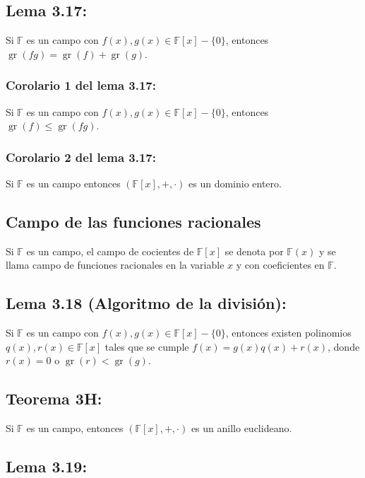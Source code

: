 \documentclass{article}
\DeclareMathOperator{\gr}{gr}
\begin{document}
\subsection*{\color{blue} Lema 3.17:}

Si $\mathbb{F}$ es un campo con $f(x),g(x)\in\mathbb{F}[x]-\{0\}$, entonces $\gr(fg)=\gr(f)+\gr(g)$.

\subsubsection*{\color{blue} Corolario 1 del lema 3.17:}

Si $\mathbb{F}$ es un campo con $f(x),g(x)\in\mathbb{F}[x]-\{0\}$, entonces $\gr(f)\leq\gr(fg)$.

\subsubsection*{\color{blue} Corolario 2 del lema 3.17:}

Si $\mathbb{F}$ es un campo entonces $(\mathbb{F}[x],+,\cdot)$ es un dominio entero.

\subsection*{\color{violet} Campo de las funciones racionales}

Si $\mathbb{F}$ es un campo, el campo de cocientes de $\mathbb{F}[x]$ se denota por $\mathbb{F}(x)$ y se llama campo de funciones racionales en la variable $x$ y con coeficientes en $\mathbb{F}$.

\subsection*{\color{blue} Lema 3.18 (Algoritmo de la división):}

Si $\mathbb{F}$ es un campo con $f(x),g(x)\in\mathbb{F}[x]-\{0\}$, entonces existen polinomios $q(x),r(x)\in\mathbb{F}[x]$ tales que se cumple $f(x)=g(x)q(x)+r(x)$, donde $r(x)=0$ o $\gr(r)<\gr(g)$.

\subsection*{\color{red} Teorema 3H:}

Si $\mathbb{F}$ es un campo, entonces $(\mathbb{F}[x],+,\cdot)$ es un anillo euclideano.

\subsection*{\color{blue} Lema 3.19:}
\end{document}
